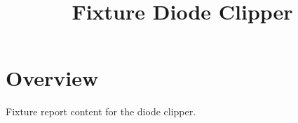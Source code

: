 \documentclass{article}
\title{Fixture Diode Clipper}
\begin{document}
\section{Overview}
Fixture report content for the diode clipper.
\end{document}

